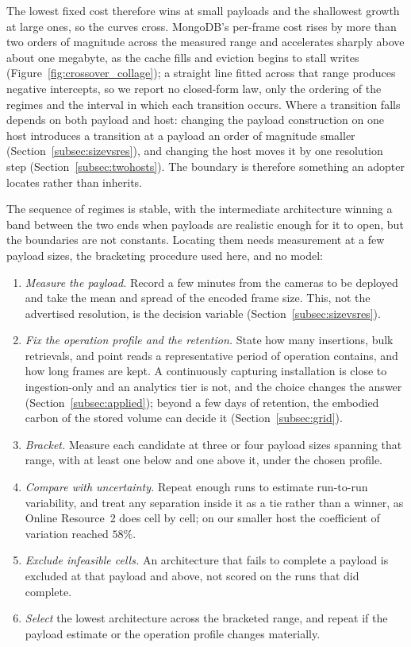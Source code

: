 \documentclass[pdflatex,sn-basic]{sn-jnl}%
\begin{document}
The lowest fixed cost therefore wins at small payloads and the shallowest growth at large ones, so the curves cross. MongoDB's per-frame cost rises by more than two orders of magnitude across the measured range and accelerates sharply above about one megabyte, as the cache fills and eviction begins to stall writes~\citep{percona_wiredtiger_eviction} (Figure~\ref{fig:crossover_collage}); a straight line fitted across that range produces negative intercepts, so we report no closed-form law, only the ordering of the regimes and the interval in which each transition occurs. Where a transition falls depends on both payload and host: changing the payload construction on one host introduces a transition at a payload an order of magnitude smaller (Section~\ref{subsec:sizevsres}), and changing the host moves it by one resolution step (Section~\ref{subsec:twohosts}). The boundary is therefore something an adopter locates rather than inherits.

The sequence of regimes is stable, with the intermediate architecture winning a band between the two ends when payloads are realistic enough for it to open, but the boundaries are not constants. Locating them needs measurement at a few payload sizes, the bracketing procedure used here, and no model:

\begin{enumerate}\setlength{\itemsep}{1pt}\setlength{\parskip}{0pt}
  \item \emph{Measure the payload.} Record a few minutes from the cameras to be deployed and take the mean and spread of the encoded frame size. This, not the advertised resolution, is the decision variable (Section~\ref{subsec:sizevsres}).
  \item \emph{Fix the operation profile and the retention.} State how many insertions, bulk retrievals, and point reads a representative period of operation contains, and how long frames are kept. A continuously capturing installation is close to ingestion-only and an analytics tier is not, and the choice changes the answer (Section~\ref{subsec:applied}); beyond a few days of retention, the embodied carbon of the stored volume can decide it (Section~\ref{subsec:grid}).
  \item \emph{Bracket.} Measure each candidate at three or four payload sizes spanning that range, with at least one below and one above it, under the chosen profile.
  \item \emph{Compare with uncertainty.} Repeat enough runs to estimate run-to-run variability, and treat any separation inside it as a tie rather than a winner, as Online Resource~2 does cell by cell; on our smaller host the coefficient of variation reached $58\%$.
  \item \emph{Exclude infeasible cells.} An architecture that fails to complete a payload is excluded at that payload and above, not scored on the runs that did complete.
  \item \emph{Select} the lowest architecture across the bracketed range, and repeat if the payload estimate or the operation profile changes materially.
\end{enumerate}
\end{document}
